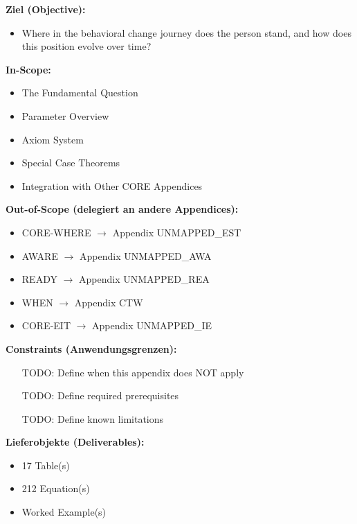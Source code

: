 \begin{tcolorbox}[
    colback=orange!5!white,
    colframe=orange!75!black,
    title={\textbf{Appendix Scope: Ziel / In-Scope / Out-of-Scope / Constraints}},
    fonttitle=\bfseries
]

\textbf{Ziel (Objective):}
\begin{itemize}[nosep]
    \item Where in the behavioral change journey does the person stand, and how does this position evolve over time?
\end{itemize}

\textbf{In-Scope:}
\begin{itemize}[nosep]
    \item The Fundamental Question
    \item Parameter Overview
    \item Axiom System
    \item Special Case Theorems
    \item Integration with Other CORE Appendices
\end{itemize}

\textbf{Out-of-Scope (delegiert an andere Appendices):}
\begin{itemize}[nosep]
    \item CORE-WHERE $\rightarrow$ Appendix UNMAPPED_EST
    \item AWARE $\rightarrow$ Appendix UNMAPPED_AWA
    \item READY $\rightarrow$ Appendix UNMAPPED_REA
    \item WHEN $\rightarrow$ Appendix CTW
    \item CORE-EIT $\rightarrow$ Appendix UNMAPPED_IE
\end{itemize}

\textbf{Constraints (Anwendungsgrenzen):}
\begin{itemize}[nosep]
    \item [TODO: Define when this appendix does NOT apply]
    \item [TODO: Define required prerequisites]
    \item [TODO: Define known limitations]
\end{itemize}

\textbf{Lieferobjekte (Deliverables):}
\begin{itemize}[nosep]
    \item 17 Table(s)
    \item 212 Equation(s)
    \item Worked Example(s)
\end{itemize}

\end{tcolorbox}



